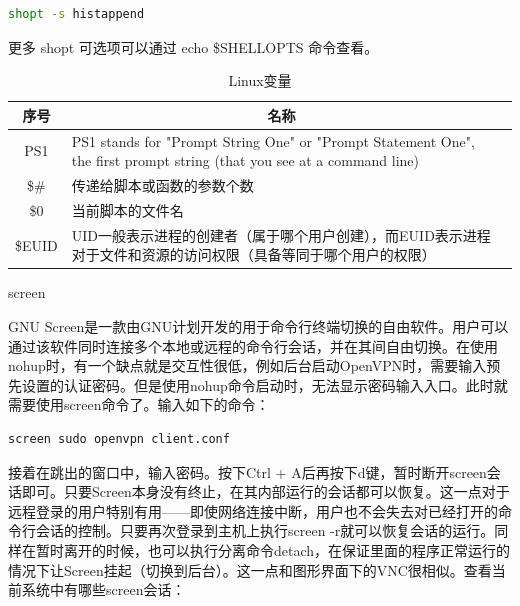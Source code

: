 \documentclass[12pt]{book}
\makeatletter
\numberwithin{dummy}{section}
\theoremstyle{ocrenumbox}
\theoremstyle{blacknumex}
\theoremstyle{blacknumbox}
\theoremstyle{ocrenum}
\renewcommand{\subsubsection}{\@startsection {subsubsection}{3}{\z@}
	{-2ex \@plus -0.1ex \@minus -.2ex}
	{.2ex \@plus.2ex }
	{\normalfont\small\sffamily\bfseries}}
\makeatother
\begin{document}
\begin{lstlisting}[language=Bash]
shopt -s histappend
\end{lstlisting}

更多 shopt 可选项可以通过 echo \$SHELLOPTS 命令查看。

\begin{table}
	\caption{Linux变量}
	\label{table:linuxenvironmentvariable}
	\begin{center}
	\begin{tabular}{cp{10cm}c}
		\hline
		\multirow{1}{*}{序号}
		& \multicolumn{1}{c}{名称}  \\
		\hline			
		PS1  & PS1 stands for "Prompt String One" or "Prompt Statement One", the first prompt string (that you see at a command line) \\
		\$\# & 传递给脚本或函数的参数个数 \\
		\$0 & 当前脚本的文件名 \\
		\$EUID & UID一般表示进程的创建者（属于哪个用户创建），而EUID表示进程对于文件和资源的访问权限（具备等同于哪个用户的权限） \\
		\hline
	\end{tabular}	
	\end{center}
\end{table}

\subsubsection{screen}

GNU Screen是一款由GNU计划开发的用于命令行终端切换的自由软件。用户可以通过该软件同时连接多个本地或远程的命令行会话，并在其间自由切换。在使用nohup时，有一个缺点就是交互性很低，例如后台启动OpenVPN时，需要输入预先设置的认证密码。但是使用nohup命令启动时，无法显示密码输入入口。此时就需要使用screen命令了。输入如下的命令：

\begin{lstlisting}[language=Bash]
screen sudo openvpn client.conf
\end{lstlisting}

接着在跳出的窗口中，输入密码。按下Ctrl + A后再按下d键，暂时断开screen会话即可。只要Screen本身没有终止，在其内部运行的会话都可以恢复。这一点对于远程登录的用户特别有用——即使网络连接中断，用户也不会失去对已经打开的命令行会话的控制。只要再次登录到主机上执行screen -r就可以恢复会话的运行。同样在暂时离开的时候，也可以执行分离命令detach，在保证里面的程序正常运行的情况下让Screen挂起（切换到后台）。这一点和图形界面下的VNC很相似。查看当前系统中有哪些screen会话：
\end{document}
